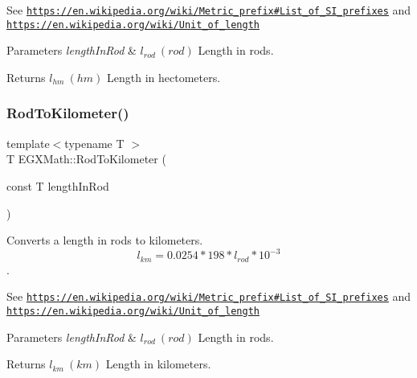 See \href{https://en.wikipedia.org/wiki/Metric_prefix#List_of_SI_prefixes}{\tt https\+://en.\+wikipedia.\+org/wiki/\+Metric\+\_\+prefix\#\+List\+\_\+of\+\_\+\+S\+I\+\_\+prefixes} and \href{https://en.wikipedia.org/wiki/Unit_of_length}{\tt https\+://en.\+wikipedia.\+org/wiki/\+Unit\+\_\+of\+\_\+length} 
\begin{DoxyParams}{Parameters}
{\em length\+In\+Rod} & $ l_{rod}\ (rod)$ Length in rods. \\
\hline
\end{DoxyParams}
\begin{DoxyReturn}{Returns}
$ l_{hm}\ (hm)$ Length in hectometers. 
\end{DoxyReturn}
\mbox{\label{group___e_g_x_math-_conversions-_length_conversions-_imperial-_rod-_s_i_ga074418cb0c673bef5eed361a610866a0}} 
\subsubsection{\texorpdfstring{Rod\+To\+Kilometer()}{RodToKilometer()}}
{\footnotesize\ttfamily template$<$typename T $>$ \\
T E\+G\+X\+Math\+::\+Rod\+To\+Kilometer (\begin{DoxyParamCaption}\item[{const T}]{length\+In\+Rod }\end{DoxyParamCaption})}



Converts a length in rods to kilometers. \[ l_{km}=0.0254 * 198 * l_{rod} * 10^{-3} \]. 

See \href{https://en.wikipedia.org/wiki/Metric_prefix#List_of_SI_prefixes}{\tt https\+://en.\+wikipedia.\+org/wiki/\+Metric\+\_\+prefix\#\+List\+\_\+of\+\_\+\+S\+I\+\_\+prefixes} and \href{https://en.wikipedia.org/wiki/Unit_of_length}{\tt https\+://en.\+wikipedia.\+org/wiki/\+Unit\+\_\+of\+\_\+length} 
\begin{DoxyParams}{Parameters}
{\em length\+In\+Rod} & $ l_{rod}\ (rod)$ Length in rods. \\
\hline
\end{DoxyParams}
\begin{DoxyReturn}{Returns}
$ l_{km}\ (km)$ Length in kilometers. 
\end{DoxyReturn}
\mbox{\label{group___e_g_x_math-_conversions-_length_conversions-_imperial-_rod-_s_i_ga9d9fb3fa0628bdf3b9fb60f719f8010e}} 
